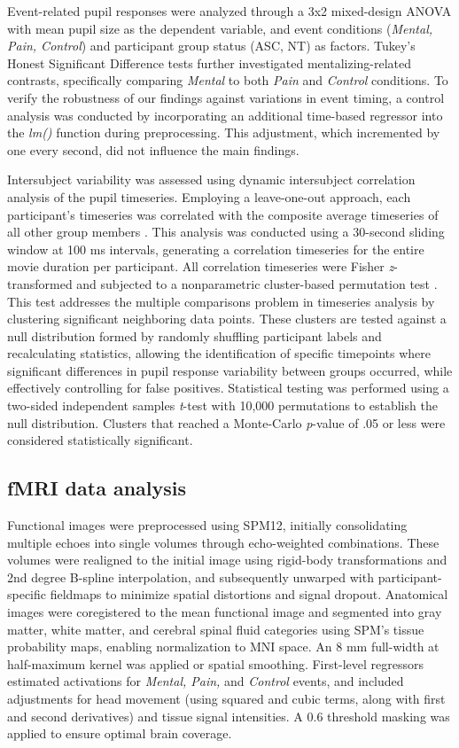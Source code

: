 Event-related pupil responses were analyzed through a 3x2 mixed-design ANOVA with mean pupil size as the dependent variable, and event conditions (\textit{Mental, Pain, Control}) and participant group status (ASC, NT) as factors. Tukey's Honest Significant Difference tests further investigated mentalizing-related contrasts, specifically comparing \textit{Mental} to both \textit{Pain} and \textit{Control} conditions. To verify the robustness of our findings against variations in event timing, a control analysis was conducted by incorporating an additional time-based regressor into the \textit{lm()} function during preprocessing. This adjustment, which incremented by one every second, did not influence the main findings.

Intersubject variability was assessed using dynamic intersubject correlation analysis of the pupil timeseries. Employing a leave-one-out approach, each participant's timeseries was correlated with the composite average timeseries of all other group members \citep{nastase2019}. This analysis was conducted using a 30-second sliding window at 100 ms intervals, generating a correlation timeseries for the entire movie duration per participant. All correlation timeseries were Fisher \textit{z}-transformed and subjected to a nonparametric cluster-based permutation test \citep{maris2007}. This test addresses the multiple comparisons problem in timeseries analysis by clustering significant neighboring data points. These clusters are tested against a null distribution formed by randomly shuffling participant labels and recalculating statistics, allowing the identification of specific timepoints where significant differences in pupil response variability between groups occurred, while effectively controlling for false positives. Statistical testing was performed using a two-sided independent samples \textit{t}-test with 10,000 permutations to establish the null distribution. Clusters that reached a Monte-Carlo \textit{p}-value of .05 or less were considered statistically significant.

\subsection{fMRI data analysis}
Functional images were preprocessed using SPM12, initially consolidating multiple echoes into single volumes through echo-weighted combinations. These volumes were realigned to the initial image using rigid-body transformations and 2nd degree B-spline interpolation, and subsequently unwarped with participant-specific fieldmaps to minimize spatial distortions and signal dropout. Anatomical images were coregistered to the mean functional image and segmented into gray matter, white matter, and cerebral spinal fluid categories using SPM's tissue probability maps, enabling normalization to MNI space. An 8 mm full-width at half-maximum kernel was applied or spatial smoothing. First-level regressors estimated activations for \textit{Mental, Pain,} and \textit{Control} events, and included adjustments for head movement (using squared and cubic terms, along with first and second derivatives) and tissue signal intensities. A 0.6 threshold masking was applied to ensure optimal brain coverage.

